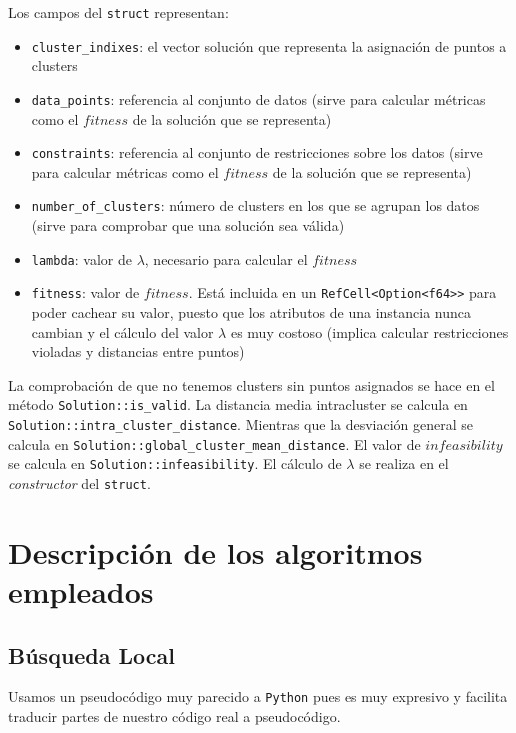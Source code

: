 \documentclass[11pt]{article}
\begin{document}
Los campos del \lstinline{struct} representan:

\begin{itemize}
    \item \lstinline{cluster_indixes}: el vector solución que representa la asignación de puntos a clusters
    \item \lstinline{data_points}: referencia al conjunto de datos (sirve para calcular métricas como el $fitness$ de la solución que se representa)
    \item \lstinline{constraints}: referencia al conjunto de restricciones sobre los datos (sirve para calcular métricas como el $fitness$ de la solución que se representa)
    \item \lstinline{number_of_clusters}: número de clusters en los que se agrupan los datos (sirve para comprobar que una solución sea válida)
    \item \lstinline{lambda}: valor de $\lambda$, necesario para calcular el $fitness$
    \item \lstinline{fitness}: valor de $fitness$. Está incluida en un \lstinline{RefCell<Option<f64>>} para poder cachear su valor, puesto que los atributos de una instancia nunca cambian y el cálculo del valor $\lambda$ es muy costoso (implica calcular restricciones violadas y distancias entre puntos)
\end{itemize}

La comprobación de que no tenemos clusters sin puntos asignados se hace en el método \lstinline{Solution::is_valid}. La distancia media intracluster se calcula en \lstinline{Solution::intra_cluster_distance}. Mientras que la desviación general se calcula en \lstinline{Solution::global_cluster_mean_distance}. El valor de $infeasibility$ se calcula en \lstinline{Solution::infeasibility}. El cálculo de $\lambda$ se realiza en el \emph{constructor} del \lstinline{struct}.

\pagebreak

\section{Descripción de los algoritmos empleados}

\subsection{Búsqueda Local}

Usamos un pseudocódigo muy parecido a \lstinline{Python} pues es muy expresivo y facilita traducir partes de nuestro código real a pseudocódigo.
\end{document}
